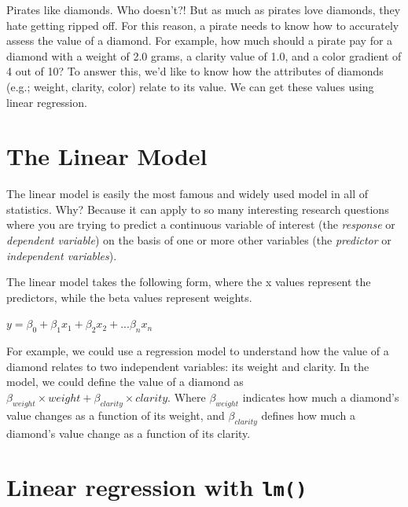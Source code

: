 \documentclass[]{book}
\theoremstyle{definition}
\theoremstyle{definition}
\theoremstyle{remark}
\begin{document}
Pirates like diamonds. Who doesn't?! But as much as pirates love
diamonds, they hate getting ripped off. For this reason, a pirate needs
to know how to accurately assess the value of a diamond. For example,
how much should a pirate pay for a diamond with a weight of 2.0 grams, a
clarity value of 1.0, and a color gradient of 4 out of 10? To answer
this, we'd like to know how the attributes of diamonds (e.g.; weight,
clarity, color) relate to its value. We can get these values using
linear regression.

\section{The Linear Model}\label{the-linear-model}

The linear model is easily the most famous and widely used model in all
of statistics. Why? Because it can apply to so many interesting research
questions where you are trying to predict a continuous variable of
interest (the \emph{response} or \emph{dependent variable}) on the basis
of one or more other variables (the \emph{predictor} or
\emph{independent variables}).

The linear model takes the following form, where the x values represent
the predictors, while the beta values represent weights.

\(y=\beta_{0}+\beta_{1}x_{1}+\beta_{2}x_{2}+...\beta_{n}x_{n}\)

For example, we could use a regression model to understand how the value
of a diamond relates to two independent variables: its weight and
clarity. In the model, we could define the value of a diamond as
\(\beta_{weight} \times weight + \beta_{clarity} \times clarity\). Where
\(\beta_{weight}\) indicates how much a diamond's value changes as a
function of its weight, and \(\beta_{clarity}\) defines how much a
diamond's value change as a function of its clarity.

\section{\texorpdfstring{Linear regression with
\texttt{lm()}}{Linear regression with lm()}}\label{linear-regression-with-lm}
\end{document}

